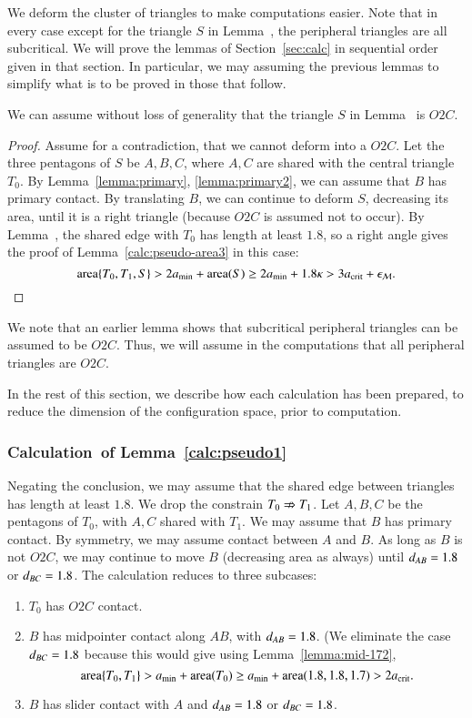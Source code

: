 We deform the cluster of triangles to make computations easier.  Note
that in every case except for the triangle $S$ in
Lemma~, the peripheral triangles are all
subcritical.  We will prove the lemmas of Section~\ref{sec:calc} in
sequential order given in that section.  In particular, we may
assuming the previous lemmas to simplify what is to be proved in those
that follow.

\begin{lemma}  
  We can assume without loss of generality that the triangle $S$ in
  Lemma~ is $O2C$.
\end{lemma}

\begin{proof} 
  Assume for a contradiction, that we cannot deform into a $O2C$.  Let
  the three pentagons of $S$ be $A,B,C$, where $A,C$ are shared with
  the central triangle $T_0$.  By Lemma~\ref{lemma:primary},
  \ref{lemma:primary2}, we can assume that $B$ has primary contact.
  By translating $B$, we can continue to deform $S$, decreasing its
  area, until it is a right triangle (because $O2C$ is assumed not to
  occur).  By Lemma~, the shared edge with $T_0$ has
  length at least $1.8$, so a right angle gives the proof of
  Lemma~\ref{calc:pseudo-area3} in this case:
\[
{\operatorname{area}}\{T_0,T_1,S\} > 2a_\text{min} + {\operatorname{area}}(S) 
\ge 2a_\text{min} + 1.8\kappa > 3a_\text{crit} + \epsilon_{\mathcal M}.
\]
\end{proof}


We note that an earlier lemma shows that subcritical peripheral
triangles can be assumed to be $O2C$. Thus, we will assume in the
computations that all peripheral triangles are $O2C$.

In the rest of this section, we describe how each calculation has been
prepared, to reduce the dimension of the configuration space, prior to
computation.

\subsubsection{Calculation~of Lemma~\ref{calc:pseudo1}} 
Negating the conclusion, we may assume that the shared edge between
triangles has length at least $1.8$.  We drop the constrain $T_0\nRightarrow
T_1$.  Let $A,B,C$ be the pentagons of $T_0$, with $A,C$ shared with
$T_1$. We may assume that $B$ has primary contact. By symmetry, we may
assume contact between $A$ and $B$.  As long as $B$ is not $O2C$, we
may continue to move $B$ (decreasing area as always) until
$d_{AB}=1.8$ or $d_{BC}=1.8$.  The calculation reduces to three
subcases:
\begin{enumerate}
\item $T_0$ has $O2C$ contact.
\item $B$ has midpointer contact along $AB$, with $d_{AB}=1.8$.  (We
  eliminate the case $d_{BC}=1.8$ because this would give using
  Lemma~\ref{lemma:mid-172},
\[
{\operatorname{area}}\{T_0,T_1\} > a_\text{min} + {\operatorname{area}}(T_0) \ge a_\text{min} + {\operatorname{area}}(1.8,1.8,1.7) > 2a_\text{crit}.
\]
\item $B$ has slider contact with $A$ and $d_{AB}=1.8$ or
  $d_{BC}=1.8$.
\end{enumerate}

